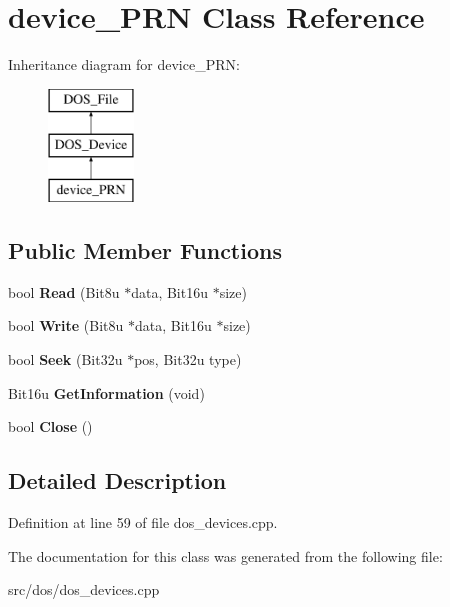 \hypertarget{classdevice__PRN}{\section{device\-\_\-\-P\-R\-N Class Reference}
\label{classdevice__PRN}
}
Inheritance diagram for device\-\_\-\-P\-R\-N\-:\begin{figure}[H]
\begin{center}
\leavevmode
\includegraphics[height=3.000000cm]{classdevice__PRN}
\end{center}
\end{figure}
\subsection*{Public Member Functions}
\begin{DoxyCompactItemize}
\item 
\hypertarget{classdevice__PRN_ab2635625d0731e0733c11b2cd0732b27}{bool {\bfseries Read} (Bit8u $\ast$data, Bit16u $\ast$size)}\label{classdevice__PRN_ab2635625d0731e0733c11b2cd0732b27}

\item 
\hypertarget{classdevice__PRN_ab0360c00954e3c97fac5880d44f137e9}{bool {\bfseries Write} (Bit8u $\ast$data, Bit16u $\ast$size)}\label{classdevice__PRN_ab0360c00954e3c97fac5880d44f137e9}

\item 
\hypertarget{classdevice__PRN_a587013dc3143e4832d6119effe656a61}{bool {\bfseries Seek} (Bit32u $\ast$pos, Bit32u type)}\label{classdevice__PRN_a587013dc3143e4832d6119effe656a61}

\item 
\hypertarget{classdevice__PRN_a65d97b1a638d41ac89e58a4f3a5c5d84}{Bit16u {\bfseries Get\-Information} (void)}\label{classdevice__PRN_a65d97b1a638d41ac89e58a4f3a5c5d84}

\item 
\hypertarget{classdevice__PRN_a92e246dc979d2faef8a0c48700f665ed}{bool {\bfseries Close} ()}\label{classdevice__PRN_a92e246dc979d2faef8a0c48700f665ed}

\end{DoxyCompactItemize}


\subsection{Detailed Description}


Definition at line 59 of file dos\-\_\-devices.\-cpp.



The documentation for this class was generated from the following file\-:\begin{DoxyCompactItemize}
\item 
src/dos/dos\-\_\-devices.\-cpp\end{DoxyCompactItemize}
